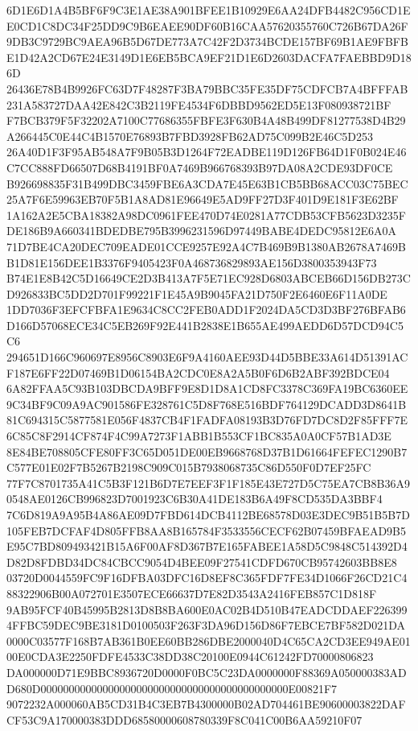 \documentclass[UTF8,fontset=fandol,zihao=-4,a4paper]{ctexart}
\begin{document}
{{6D1E6D1A4B5BF6F9C3E1AE38A901BFEE1B10929E6AA24DFB4482C956CD1EE0CD1C8DC34F25DD9C9B6EAEE90DF60B16CAA57620355760C726B67DA26F
9DB3C9729BC9AEA96B5D67DE773A7C42F2D3734BCDE157BF69B1AE9FBFBE1D42A2CD67E24E3149D1E6EB5BCA9EF21D1E6D2603DACFA7FAEBBD9D186D
26436E78B4B9926FC63D7F48287F3BA79BBC35FE35DF75CDFCB7A4BFFFAB231A583727DAA42E842C3B2119FE4534F6DBBD9562ED5E13F080938721BF
F7BCB379F5F32202A7100C77686355FBFE3F630B4A48B499DF81277538D4B29A266445C0E44C4B1570E76893B7FBD3928FB62AD75C099B2E46C5D253
26A40D1F3F95AB548A7F9B05B3D1264F72EADBE119D126FB64D1F0B024E46C7CC888FD66507D68B4191BF0A7469B966768393B97DA08A2CDE93DF0CE
B926698835F31B499DBC3459FBE6A3CDA7E45E63B1CB5BB68ACC03C75BEC25A7F6E59963EB70F5B1A8AD81E96649E5AD9FF27D3F401D9E181F3E62BF
1A162A2E5CBA18382A98DC0961FEE470D74E0281A77CDB53CFB5623D3235FDE186B9A660341BDEDBE795B3996231596D97449BABE4DEDC95812E6A0A
71D7BE4CA20DEC709EADE01CCE9257E92A4C7B469B9B1380AB2678A7469BB1D81E156DEE1B3376F9405423F0A468736829893AE156D3800353943F73
B74E1E8B42C5D16649CE2D3B413A7F5E71EC928D6803ABCEB66D156DB273CD926833BC5DD2D701F99221F1E45A9B9045FA21D750F2E6460E6F11A0DE
1DD7036F3EFCFBFA1E9634C8CC2FEB0ADD1F2024DA5CD3D3BF276BFAB6D166D57068ECE34C5EB269F92E441B2838E1B655AE499AEDD6D57DCD94C5C6
294651D166C960697E8956C8903E6F9A4160AEE93D44D5BBE33A614D51391ACF187E6FF22D07469B1D06154BA2CDC0E8A2A5B0F6D6B2ABF392BDCE04
6A82FFAA5C93B103DBCDA9BFF9E8D1D8A1CD8FC3378C369FA19BC6360EE9C34BF9C09A9AC901586FE328761C5D8F768E516BDF764129DCADD3D8641B
81C694315C5877581E056F4837CB4F1FADFA08193B3D76FD7DC8D2F85FFF7E6C85C8F2914CF874F4C99A7273F1ABB1B553CF1BC835A0A0CF57B1AD3E
8E84BE708805CFE80FF3C65D051DE00EB9668768D37B1D61664FEFEC1290B7C577E01E02F7B5267B2198C909C015B7938068735C86D550F0D7EF25FC
77F7C8701735A41C5B3F121B6D7E7EEF3F1F185E43E727D5C75EA7CB8B36A90548AE0126CB996823D7001923C6B30A41DE183B6A49F8CD535DA3BBF4
7C6D819A9A95B4A86AE09D7FBD614DCB4112BE68578D03E3DEC9B51B5B7D105FEB7DCFAF4D805FFB8AA8B165784F3533556CECF62B07459BFAEAD9B5
E95C7BD809493421B15A6F00AF8D367B7E165FABEE1A58D5C9848C514392D4D82D8FDBD34DC84CBCC9054D4BEE09F27541CDFD670CB95742603BB8E8
03720D0044559FC9F16DFBA03DFC16D8EF8C365FDF7FE34D1066F26CD21C488322906B00A072701E3507ECE66637D7E82D3543A2416FEB857C1D818F
9AB95FCF40B45995B2813D8B8BA600E0AC02B4D510B47EADCDDAEF2263994FFBC59DEC9BE3181D0100503F263F3DA96D156D86F7EBCE7BF582D021DA
0000C03577F168B7AB361B0EE60BB286DBE2000040D4C65CA2CD3EE949AE0100E0CDA3E2250FDFE4533C38DD38C20100E0944C61242FD70000806823
DA000000D71E9BBC8936720D0000F0BC5C23DA0000000F88369A050000383ADD680D00000000000000000000000000000000000000000000E00821F7
9072232A000060AB5CD31B4C3EB7B4300000B02AD704461BE90600003822DAFCF53C9A170000383DDD68580000608780339F8C041C00B6AA59210F07
}}
\end{document}
